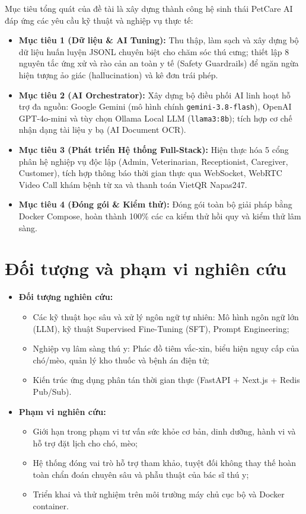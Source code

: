 Mục tiêu tổng quát của đề tài là xây dựng thành công hệ sinh thái PetCare AI đáp ứng các yêu cầu kỹ thuật và nghiệp vụ thực tế:
\begin{itemize}[leftmargin=1.5cm]
    \item \textbf{Mục tiêu 1 (Dữ liệu \& AI Tuning):} Thu thập, làm sạch và xây dựng bộ dữ liệu huấn luyện JSONL chuyên biệt cho chăm sóc thú cưng; thiết lập 8 nguyên tắc ứng xử và rào cản an toàn y tế (Safety Guardrails) để ngăn ngừa hiện tượng ảo giác (hallucination) và kê đơn trái phép.
    \item \textbf{Mục tiêu 2 (AI Orchestrator):} Xây dựng bộ điều phối AI linh hoạt hỗ trợ đa nguồn: Google Gemini (mô hình chính \texttt{gemini-3.8-flash}), OpenAI GPT-4o-mini và tùy chọn Ollama Local LLM (\texttt{llama3:8b}); tích hợp cơ chế nhận dạng tài liệu y bạ (AI Document OCR).
    \item \textbf{Mục tiêu 3 (Phát triển Hệ thống Full-Stack):} Hiện thực hóa 5 cổng phân hệ nghiệp vụ độc lập (Admin, Veterinarian, Receptionist, Caregiver, Customer), tích hợp thông báo thời gian thực qua WebSocket, WebRTC Video Call khám bệnh từ xa và thanh toán VietQR Napas247.
    \item \textbf{Mục tiêu 4 (Đóng gói \& Kiểm thử):} Đóng gói toàn bộ giải pháp bằng Docker Compose, hoàn thành 100\% các ca kiểm thử hồi quy và kiểm thử lâm sàng.
\end{itemize}

\section{Đối tượng và phạm vi nghiên cứu}
\label{sec:phamvi}

\begin{itemize}[leftmargin=1.5cm]
    \item \textbf{Đối tượng nghiên cứu:} 
    \begin{itemize}
        \item Các kỹ thuật học sâu và xử lý ngôn ngữ tự nhiên: Mô hình ngôn ngữ lớn (LLM), kỹ thuật Supervised Fine-Tuning (SFT), Prompt Engineering;
        \item Nghiệp vụ lâm sàng thú y: Phác đồ tiêm vắc-xin, biểu hiện nguy cấp của chó/mèo, quản lý kho thuốc và bệnh án điện tử;
        \item Kiến trúc ứng dụng phân tán thời gian thực (FastAPI + Next.js + Redis Pub/Sub).
    \end{itemize}
    \item \textbf{Phạm vi nghiên cứu:} 
    \begin{itemize}
        \item Giới hạn trong phạm vi tư vấn sức khỏe cơ bản, dinh dưỡng, hành vi và hỗ trợ đặt lịch cho chó, mèo;
        \item Hệ thống đóng vai trò hỗ trợ tham khảo, tuyệt đối không thay thế hoàn toàn chẩn đoán chuyên sâu và phẫu thuật của bác sĩ thú y;
        \item Triển khai và thử nghiệm trên môi trường máy chủ cục bộ và Docker container.
    \end{itemize}
\end{itemize}

